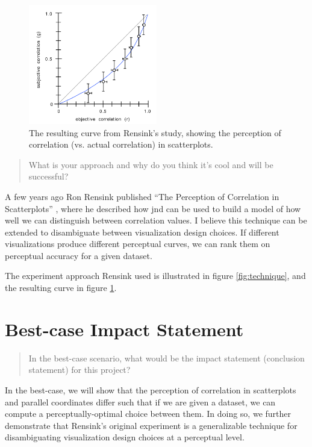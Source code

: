 \documentclass{proc}
\begin{document}
\begin{figure}[t]
  \centering
    \includegraphics[width=0.5\textwidth]{img/curve}
    \caption{The resulting curve from Rensink's study, showing the perception of correlation (vs. actual correlation) in scatterplots.}
  \label{fig:curve}
\end{figure}


\begin{quote}
What is your approach and why do you think it’s cool and will be successful?
\end{quote}

A few years ago Ron Rensink published ``The Perception of Correlation in Scatterplots'' \cite{Rensink2010}, where he described how jnd can be used to build a model of how well we can distinguish between correlation values.
I believe this technique can be extended to disambiguate between visualization design choices. 
If different visualizations produce different perceptual curves, we can rank them on perceptual accuracy for a given dataset.

The experiment approach Rensink used is illustrated in figure \ref{fig:technique}, and the resulting curve in figure \ref{fig:curve}.

\section{Best-case Impact Statement}
\begin{quote}
In the best-case scenario, what would be the impact statement (conclusion statement) for this project?
\end{quote}

In the best-case, we will show that the perception of correlation in scatterplots and parallel coordinates differ such that if we are given a dataset, we can compute a perceptually-optimal choice between them.
In doing so, we further demonstrate that Rensink's original experiment is a generalizable technique for disambiguating visualization design choices at a perceptual level.
\end{document}
